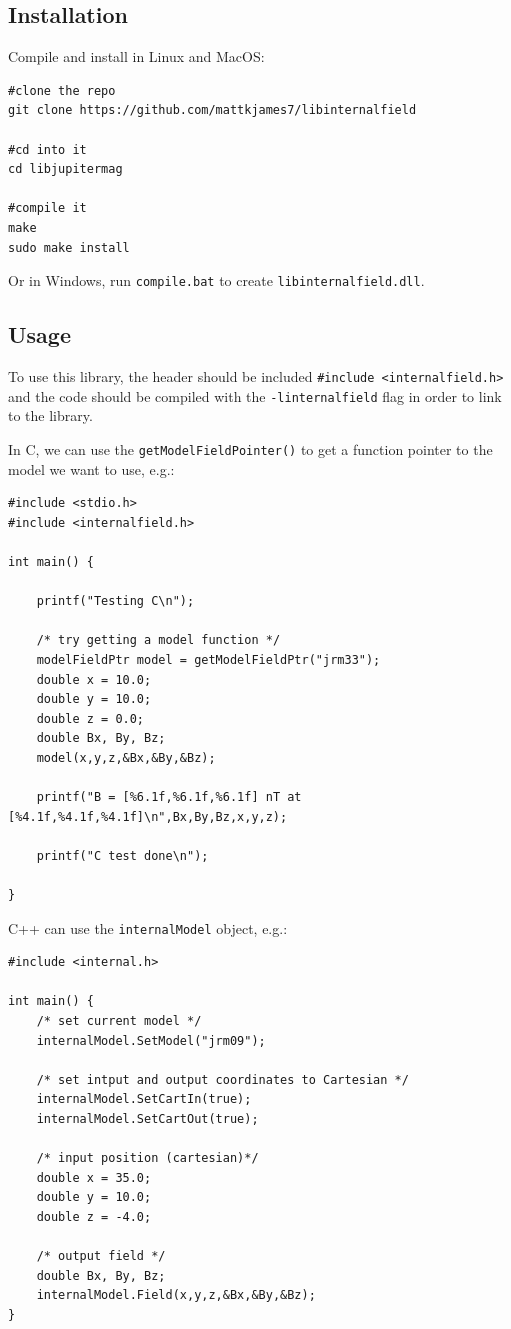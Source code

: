 		\subsection{Installation}

			Compile and install in Linux and MacOS:

			\begin{verbatim}
#clone the repo
git clone https://github.com/mattkjames7/libinternalfield
		
#cd into it
cd libjupitermag
			
#compile it
make
sudo make install
			\end{verbatim}

			Or in Windows, run \texttt{compile.bat} to create \texttt{libinternalfield.dll}.

		\subsection{Usage}

			To use this library, the header should be included \texttt{#include <internalfield.h>} and the code should be compiled with the \texttt{-linternalfield} flag in order to link to the library.

			In C, we can use the \texttt{getModelFieldPointer()} to get a function pointer to the model we want to use, e.g.:
			\begin{verbatim}
#include <stdio.h>
#include <internalfield.h>

int main() {

	printf("Testing C\n");
	
	/* try getting a model function */
	modelFieldPtr model = getModelFieldPtr("jrm33");
	double x = 10.0;
	double y = 10.0;
	double z = 0.0;
	double Bx, By, Bz;
	model(x,y,z,&Bx,&By,&Bz);

	printf("B = [%6.1f,%6.1f,%6.1f] nT at [%4.1f,%4.1f,%4.1f]\n",Bx,By,Bz,x,y,z);

	printf("C test done\n");

}
			\end{verbatim}

			C++ can use the \texttt{internalModel} object, e.g.:
			\begin{verbatim}
#include <internal.h>

int main() {
    /* set current model */
    internalModel.SetModel("jrm09");

    /* set intput and output coordinates to Cartesian */
    internalModel.SetCartIn(true);
    internalModel.SetCartOut(true);

    /* input position (cartesian)*/
    double x = 35.0;
    double y = 10.0;
    double z = -4.0;

    /* output field */
    double Bx, By, Bz;
    internalModel.Field(x,y,z,&Bx,&By,&Bz);    
}
			\end{verbatim}



